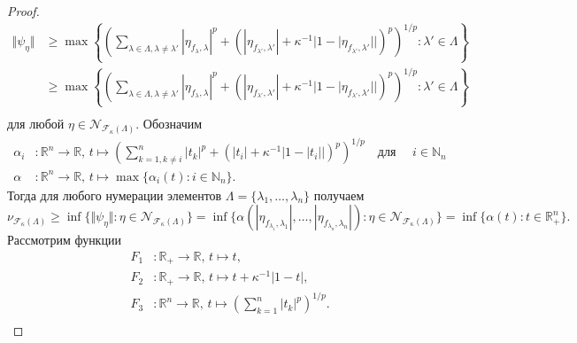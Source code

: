 \documentclass[12pt]{article}
\begin{document}
\begin{proof}
\[\begin{aligned}
        \Vert \psi_{\eta}\Vert
        &\geq\max\left\{
            \left(
                \sum_{\lambda\in\Lambda,\lambda\neq \lambda'}
                    |\eta_{f_\lambda,\lambda}|^p+
                    (
                        |\eta_{f_{\lambda'},\lambda'}|+
                        \kappa^{-1}|1-|\eta_{f_{\lambda'},\lambda'}||
                    )^p
            \right)^{1/p}:
            \lambda'\in\Lambda
        \right\} \\
        &\geq\max\left\{
            \left(
                \sum_{\lambda\in\Lambda,\lambda\neq \lambda'} 
                    |\eta_{f_\lambda,\lambda}|^p+
                    (
                        |\eta_{f_{\lambda'},\lambda'}|+
                        \kappa^{-1}|1-|\eta_{f_{\lambda'},\lambda'}||
                    )^p
            \right)^{1/p}:
            \lambda'\in\Lambda
        \right\} \\
    \end{aligned}
    \]
    для любой $\eta\in\mathcal{N}_{\mathcal{F}_{\kappa}(\Lambda)}$. Обозначим
    \[
    \begin{aligned}
        \alpha_i&:\mathbb{R}^n\to\mathbb{R},\,
        t\mapsto \left(
            \sum_{k=1,k\neq i}^n |t_k|^p+(|t_i|+\kappa^{-1}|1-|t_i||)^p
        \right)^{1/p} \quad\text{для }\quad i\in\mathbb{N}_n \\
        \alpha&:\mathbb{R}^n\to\mathbb{R},\,
        t\mapsto\max\{\alpha_i(t):i\in\mathbb{N}_n\}.
    \end{aligned}
    \]
    Тогда для любого нумерации 
    элементов $\Lambda=\{\lambda_1,\ldots,\lambda_n\}$ получаем
    \[
        \nu_{\mathcal{F}_{\kappa}(\Lambda)}
        \geq\inf\{
            \Vert \psi_{\eta}\Vert : 
            \eta\in\mathcal{N}_{\mathcal{F}_{\kappa}(\Lambda)}
        \}
        =\inf\{
            \alpha(
                |\eta_{f_{\lambda_1},\lambda_1}|,
                \ldots,
                |\eta_{f_{\lambda_n},\lambda_n}|
            ) : 
            \eta\in\mathcal{N}_{\mathcal{F}_{\kappa}(\Lambda)}
        \}
        =\inf\{\alpha(t) : t\in\mathbb{R}_+^n\}.
    \]
    Рассмотрим функции
    \[
    \begin{aligned}
        F_1&:\mathbb{R}_+\to\mathbb{R},\, 
            t\mapsto t, \\
        F_2&:\mathbb{R}_+\to\mathbb{R},\, 
            t\mapsto t+\kappa^{-1}|1-t|, \\
        F_3&:\mathbb{R}^n\to\mathbb{R},\, t\mapsto 
            \left(\sum_{k=1}^n|t_k|^p\right)^{1/p}. \\

\end{aligned}\]
\end{proof}
\end{document}
